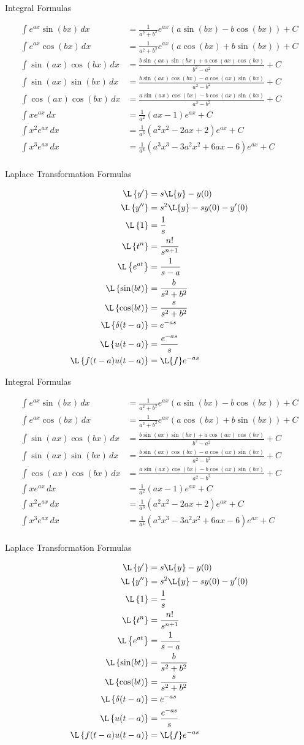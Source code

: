 \documentclass{article}
\newcommand{\tablePage}{
\begin{center}\Huge Integral Formulas\end{center}
\begin{align*}
\int e^{ax}\sin(bx) \,dx &= \frac{1}{a^2+b^2} e^{a x} \left(a \sin(bx) - b\cos(bx)\right)+C \\
\int e^{ax}\cos(bx) \,dx &= \frac{1}{a^2+b^2} e^{a x} \left(a \cos(bx) + b\sin(bx)\right)+C \\
\int \sin(a x) \cos(b x) \,dx &= \frac{b \sin(a x) \sin(b x) + a \cos(a x) \cos(b x)}{b^2 - a^2} + C \\
\int \sin(a x) \sin(b x) \,dx &= \frac{b \sin(a x) \cos(b x) - a \cos(a x) \sin(b x)}{a^2 - b^2} + C \\
\int  \cos(a x) \cos(b x) \,dx &= \frac{a \sin(a x) \cos(b x) - b \cos(a x) \sin(b x)}{a^2 - b^2} + C \\
\int xe^{ax} \,dx &= \frac{1}{a^2}(ax-1)e^{ax}+C \\
\int x^2e^{ax} \,dx &= \frac{1}{a^3}(a^2x^2-2ax+2)e^{ax}+C \\
\int x^3e^{ax} \,dx &= \frac{1}{a^4}(a^3x^3-3a^2x^2+6ax-6)e^{ax}+C \\
\end{align*}

\vfill

\begin{center}\Huge Laplace Transformation Formulas\end{center}
\begin{align*}
\L\left\{y'\right\} &= s\L\{y\}-y(0) \\
\L\left\{y''\right\} &= s^2\L\{y\}-sy(0)-y'(0) \\
\L\left\{1\right\} &= \frac{1}{s} \\
\L\left\{t^n\right\} &= \frac{n!}{s^{n+1}} \\
\L\left\{e^{at}\right\} &= \frac{1}{s-a} \\
\L\left\{ \sin(bt) \right\} &= \frac{b}{s^2+b^2}  \\ 
\L\left\{ \cos(bt) \right\} &= \frac{s}{s^2+b^2}\\ 
\L\left\{ \delta(t-a) \right\} &= e^{-as}  \\ 
\L\left\{ u(t-a)\right\} &= \frac{e^{-as}}{s} \\ 
\L\left\{ f(t-a)u(t-a)\right\} &= \L\{f\}e^{-as}  \\ 
\end{align*}
}
\begin{document}
\large
\tablePage

\newpage

\tablePage
\end{document}
